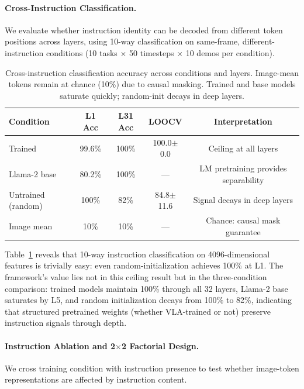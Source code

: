\documentclass[letterpaper]{article}
\begin{document}
\paragraph{Cross-Instruction Classification.}
We evaluate whether instruction identity can be decoded from different token positions across layers, using 10-way classification on same-frame, different-instruction conditions (10 tasks $\times$ 50 timesteps $\times$ 10 demos per condition).

\begin{table}[h]
\centering
\caption{Cross-instruction classification accuracy across conditions and layers. Image-mean tokens remain at chance (10\%) due to causal masking. Trained and base models saturate quickly; random-init decays in deep layers.}
\label{tab:cross_instruction}
\begin{tabular}{lcccc}
\toprule
Condition & L1 Acc & L31 Acc & LOOCV & Interpretation \\
\midrule
Trained & 99.6\% & 100\% & 100.0$\pm$0.0 & Ceiling at all layers \\
Llama-2 base & 80.2\% & 100\% & --- & LM pretraining provides separability \\
Untrained (random) & 100\% & 82\% & 84.8$\pm$11.6 & Signal decays in deep layers \\
Image mean & 10\% & 10\% & --- & Chance: causal mask guarantee \\
\bottomrule
\end{tabular}
\end{table}

Table~\ref{tab:cross_instruction} reveals that 10-way instruction classification on 4096-dimensional features is trivially easy: even random-initialization achieves 100\% at L1. The framework's value lies not in this ceiling result but in the three-condition comparison: trained models maintain 100\% through all 32 layers, Llama-2 base saturates by L5, and random initialization decays from 100\% to 82\%, indicating that structured pretrained weights (whether VLA-trained or not) preserve instruction signals through depth.

\paragraph{Instruction Ablation and 2$\times$2 Factorial Design.}
We cross training condition with instruction presence to test whether image-token representations are affected by instruction content.
\end{document}
